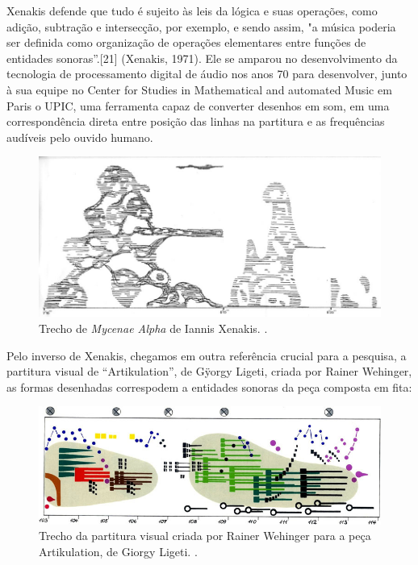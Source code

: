 Xenakis defende que tudo é sujeito às leis da lógica e suas operações, como adição, subtração e intersecção, por exemplo, e sendo assim, "a música poderia ser definida como organização de operações elementares entre funções de entidades sonoras”.[21] (Xenakis, 1971). Ele se amparou no desenvolvimento da tecnologia de processamento digital de áudio nos anos 70 para desenvolver, junto à sua equipe no Center for Studies in Mathematical and automated Music em Paris o UPIC, uma ferramenta capaz de converter desenhos em som, em uma correspondência direta entre posição das linhas na partitura e as frequências audíveis pelo ouvido humano.


\begin{figure}[ht]
    \caption{\label{xenakis}Trecho de \textit{Mycenae Alpha} de Iannis Xenakis.
.}
    \begin{center}
        \includegraphics[width=1\linewidth]{pictures/cap2/metastasis}
    \end{center}
\end{figure}

Pelo inverso de Xenakis, chegamos em outra referência crucial para a pesquisa, a partitura visual de ``Artikulation'', de Gÿorgy Ligeti, criada por Rainer Wehinger, as formas desenhadas correspodem a entidades sonoras da peça composta em fita:

\begin{figure}[ht]
    \caption{\label{ligeti}Trecho da partitura visual criada por Rainer Wehinger para a peça Artikulation, de Giorgy Ligeti.
.}
    \begin{center}
        \includegraphics[width=1\linewidth]{pictures/cap2/ligeti}
    \end{center}
\end{figure}


